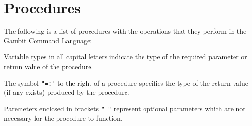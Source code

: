 \section*{Procedures}

The following is a list of procedures with the operations that they perform
in the Gambit Command Language:

Variable types in all capital letters indicate the type of the required
parameter or return value of the procedure.

The symbol {\tt "=:"} to the right of a procedure specifies the type of the 
return value (if any exists) produced by the procedure.

Paremeters enclosed in brackets {\tt "{ }"} represent optional parameters which
are not necessary for the procedure to function.

